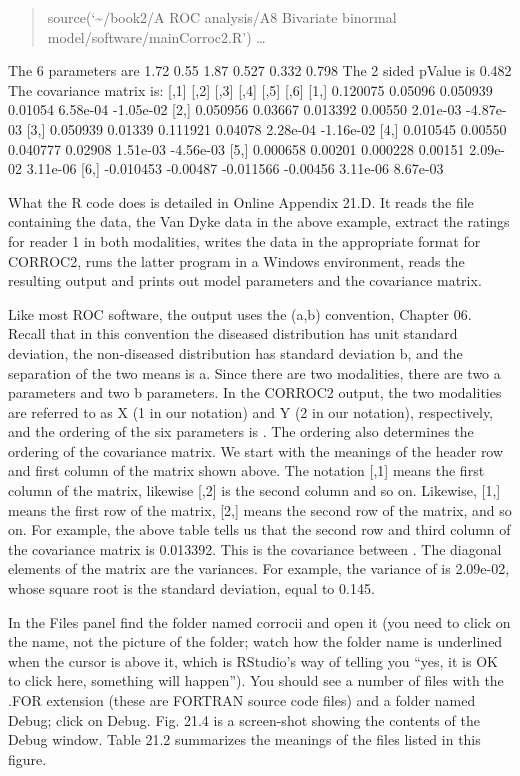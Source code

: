 \documentclass[
]{book}
\begin{document}
\begin{quote}
source(`\textasciitilde/book2/A ROC analysis/A8 Bivariate binormal model/software/mainCorroc2.R')
\ldots{}
\end{quote}

The 6 parameters are 1.72 0.55 1.87 0.527 0.332 0.798
The 2 sided pValue is 0.482
The covariance matrix is:
{[},1{]} {[},2{]} {[},3{]} {[},4{]} {[},5{]} {[},6{]}
{[}1,{]} 0.120075 0.05096 0.050939 0.01054 6.58e-04 -1.05e-02
{[}2,{]} 0.050956 0.03667 0.013392 0.00550 2.01e-03 -4.87e-03
{[}3,{]} 0.050939 0.01339 0.111921 0.04078 2.28e-04 -1.16e-02
{[}4,{]} 0.010545 0.00550 0.040777 0.02908 1.51e-03 -4.56e-03
{[}5,{]} 0.000658 0.00201 0.000228 0.00151 2.09e-02 3.11e-06
{[}6,{]} -0.010453 -0.00487 -0.011566 -0.00456 3.11e-06 8.67e-03

What the R code does is detailed in Online Appendix 21.D. It reads the file containing the data, the Van Dyke data in the above example, extract the ratings for reader 1 in both modalities, writes the data in the appropriate format for CORROC2, runs the latter program in a Windows environment, reads the resulting output and prints out model parameters and the covariance matrix.

Like most ROC software, the output uses the (a,b) convention, Chapter 06. Recall that in this convention the diseased distribution has unit standard deviation, the non-diseased distribution has standard deviation b, and the separation of the two means is a. Since there are two modalities, there are two a parameters and two b parameters. In the CORROC2 output, the two modalities are referred to as X (1 in our notation) and Y (2 in our notation), respectively, and the ordering of the six parameters is . The ordering also determines the ordering of the covariance matrix. We start with the meanings of the header row and first column of the matrix shown above. The notation {[},1{]} means the first column of the matrix, likewise {[},2{]} is the second column and so on. Likewise, {[}1,{]} means the first row of the matrix, {[}2,{]} means the second row of the matrix, and so on. For example, the above table tells us that the second row and third column of the covariance matrix is 0.013392. This is the covariance between . The diagonal elements of the matrix are the variances. For example, the variance of is 2.09e-02, whose square root is the standard deviation, equal to 0.145.

In the Files panel find the folder named corrocii and open it (you need to click on the name, not the picture of the folder; watch how the folder name is underlined when the cursor is above it, which is RStudio's way of telling you ``yes, it is OK to click here, something will happen''). You should see a number of files with the .FOR extension (these are FORTRAN source code files) and a folder named Debug; click on Debug. Fig. 21.4 is a screen-shot showing the contents of the Debug window. Table 21.2 summarizes the meanings of the files listed in this figure.
\end{document}
